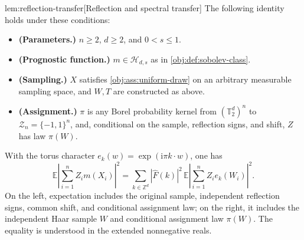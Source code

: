 \documentclass[11pt]{article}
\begin{document}
\begin{lemmav}{lem:reflection-transfer}[Reflection and spectral transfer]
The following identity holds under these conditions:
\begin{itemize}
\item \textbf{(Parameters.)} \(n\geq2\), \(d\geq2\), and \(0<s\leq1\).
\item \textbf{(Prognostic function.)} \(m\in\mathcal H_{d,s}\) as in \cref{obj:def:sobolev-class}.
\item \textbf{(Sampling.)} \(X\) satisfies \cref{obj:ass:uniform-draw} on an arbitrary measurable sampling space, and \(W,T\) are constructed as above.
\item \textbf{(Assignment.)} \(\pi\) is any Borel probability kernel from \((\mathbb T_2^d)^n\) to \(\mathcal Z_n=\{-1,1\}^n\), and, conditional on the sample, reflection signs, and shift, \(Z\) has law \(\pi(W)\).
\end{itemize}
With the torus character \(e_k(w)=\exp(\mathrm i\pi k\cdot w)\), one has
\[
\mathbb E\left|\sum_{i=1}^n Z_i m(X_i)\right|^2
=
\sum_{k\in\mathbb Z^d}
|\widehat F(k)|^2\,
\mathbb E\left|\sum_{i=1}^n Z_i e_k(W_i)\right|^2.
\]
On the left, expectation includes the original sample, independent reflection signs, common shift, and conditional assignment law; on the right, it includes the independent Haar sample \(W\) and conditional assignment law \(\pi(W)\). The equality is understood in the extended nonnegative reals.
\end{lemmav}
\end{document}
